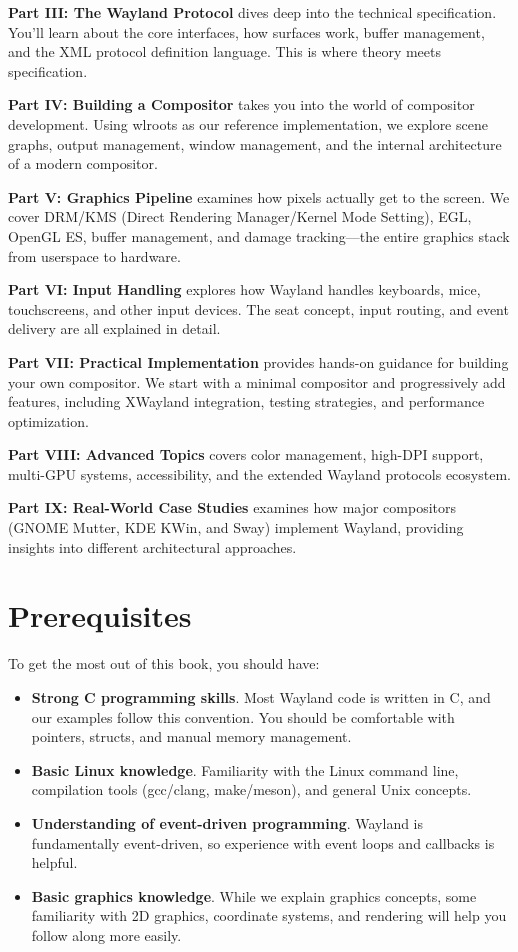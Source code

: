 \textbf{Part III: The Wayland Protocol} dives deep into the technical specification. You'll learn about the core interfaces, how surfaces work, buffer management, and the XML protocol definition language. This is where theory meets specification.

\textbf{Part IV: Building a Compositor} takes you into the world of compositor development. Using wlroots as our reference implementation, we explore scene graphs, output management, window management, and the internal architecture of a modern compositor.

\textbf{Part V: Graphics Pipeline} examines how pixels actually get to the screen. We cover DRM/KMS (Direct Rendering Manager/Kernel Mode Setting), EGL, OpenGL ES, buffer management, and damage tracking—the entire graphics stack from userspace to hardware.

\textbf{Part VI: Input Handling} explores how Wayland handles keyboards, mice, touchscreens, and other input devices. The seat concept, input routing, and event delivery are all explained in detail.

\textbf{Part VII: Practical Implementation} provides hands-on guidance for building your own compositor. We start with a minimal compositor and progressively add features, including XWayland integration, testing strategies, and performance optimization.

\textbf{Part VIII: Advanced Topics} covers color management, high-DPI support, multi-GPU systems, accessibility, and the extended Wayland protocols ecosystem.

\textbf{Part IX: Real-World Case Studies} examines how major compositors (GNOME Mutter, KDE KWin, and Sway) implement Wayland, providing insights into different architectural approaches.

\section*{Prerequisites}

To get the most out of this book, you should have:

\begin{itemize}
    \item \textbf{Strong C programming skills}. Most Wayland code is written in C, and our examples follow this convention. You should be comfortable with pointers, structs, and manual memory management.

    \item \textbf{Basic Linux knowledge}. Familiarity with the Linux command line, compilation tools (gcc/clang, make/meson), and general Unix concepts.

    \item \textbf{Understanding of event-driven programming}. Wayland is fundamentally event-driven, so experience with event loops and callbacks is helpful.

    \item \textbf{Basic graphics knowledge}. While we explain graphics concepts, some familiarity with 2D graphics, coordinate systems, and rendering will help you follow along more easily.
\end{itemize}

